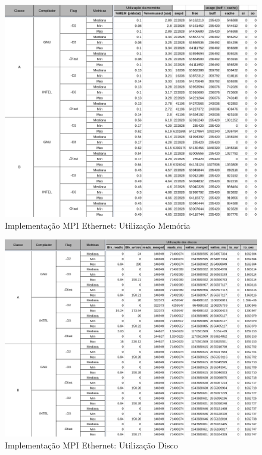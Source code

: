 \documentclass{article}
\begin{document}
\begin{appendices}
\begin{figure}[H]
    \centering
    \includegraphics[width=12cm]{Pictures/FT_r641_MPIE_MEM.png}
    \caption{Implementação MPI Ethernet: Utilização Memória}
    \label{figure:FT_r641_MPIE_MEM}
\end{figure}

\begin{figure}[H]
    \centering
    \includegraphics[width=12cm]{Pictures/FT_r641_MPIE_DISK.png}
    \caption{Implementação MPI Ethernet: Utilização Disco}
    \label{figure:FT_r641_MPIE_DISK}
\end{figure}


\end{appendices}
\end{document}
